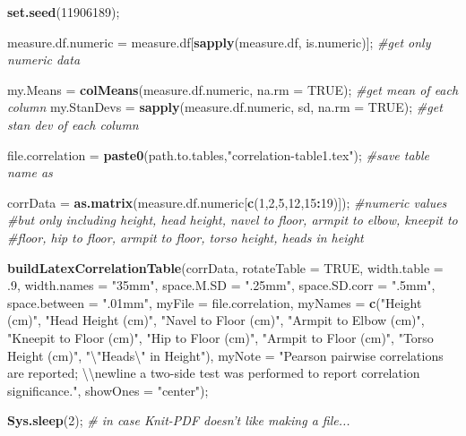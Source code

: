 \documentclass[]{article}
\newenvironment{Shaded}{\begin{snugshade}}{\end{snugshade}}
\newcommand{\CharTok}[1]{\textcolor[rgb]{0.31,0.60,0.02}{#1}}
\newcommand{\CommentTok}[1]{\textcolor[rgb]{0.56,0.35,0.01}{\textit{#1}}}
\newcommand{\DataTypeTok}[1]{\textcolor[rgb]{0.13,0.29,0.53}{#1}}
\newcommand{\DecValTok}[1]{\textcolor[rgb]{0.00,0.00,0.81}{#1}}
\newcommand{\FloatTok}[1]{\textcolor[rgb]{0.00,0.00,0.81}{#1}}
\newcommand{\KeywordTok}[1]{\textcolor[rgb]{0.13,0.29,0.53}{\textbf{#1}}}
\newcommand{\NormalTok}[1]{#1}
\newcommand{\OperatorTok}[1]{\textcolor[rgb]{0.81,0.36,0.00}{\textbf{#1}}}
\newcommand{\OtherTok}[1]{\textcolor[rgb]{0.56,0.35,0.01}{#1}}
\newcommand{\StringTok}[1]{\textcolor[rgb]{0.31,0.60,0.02}{#1}}
\begin{document}
\begin{Shaded}
\begin{Highlighting}[]
\KeywordTok{set.seed}\NormalTok{(}\DecValTok{11906189}\NormalTok{);}

\NormalTok{measure.df.numeric =}\StringTok{ }\NormalTok{measure.df[}\KeywordTok{sapply}\NormalTok{(measure.df, is.numeric)]; }\CommentTok{#get only numeric data}

\NormalTok{my.Means =}\StringTok{ }\KeywordTok{colMeans}\NormalTok{(measure.df.numeric, }\DataTypeTok{na.rm =} \OtherTok{TRUE}\NormalTok{); }\CommentTok{#get mean of each column}
\NormalTok{my.StanDevs =}\StringTok{ }\KeywordTok{sapply}\NormalTok{(measure.df.numeric, sd, }\DataTypeTok{na.rm =} \OtherTok{TRUE}\NormalTok{); }\CommentTok{#get stan dev of each column}

\NormalTok{file.correlation =}\StringTok{ }\KeywordTok{paste0}\NormalTok{(path.to.tables,}\StringTok{"correlation-table1.tex"}\NormalTok{); }\CommentTok{#save table name as}

\NormalTok{corrData =}\StringTok{ }\KeywordTok{as.matrix}\NormalTok{(measure.df.numeric[}\KeywordTok{c}\NormalTok{(}\DecValTok{1}\NormalTok{,}\DecValTok{2}\NormalTok{,}\DecValTok{5}\NormalTok{,}\DecValTok{12}\NormalTok{,}\DecValTok{15}\OperatorTok{:}\DecValTok{19}\NormalTok{)]);  }\CommentTok{#numeric values }
\CommentTok{#but only including height, head height, navel to floor, armpit to elbow, kneepit to }
\CommentTok{#floor, hip to floor, armpit to floor, torso height, heads in height}

\KeywordTok{buildLatexCorrelationTable}\NormalTok{(corrData, }
  \DataTypeTok{rotateTable =} \OtherTok{TRUE}\NormalTok{,}
  \DataTypeTok{width.table =} \FloatTok{.9}\NormalTok{,}
  \DataTypeTok{width.names =} \StringTok{"35mm"}\NormalTok{,}
  \DataTypeTok{space.M.SD =} \StringTok{".25mm"}\NormalTok{,}
  \DataTypeTok{space.SD.corr =} \StringTok{".5mm"}\NormalTok{,}
  \DataTypeTok{space.between =} \StringTok{".01mm"}\NormalTok{,}
  \DataTypeTok{myFile =}\NormalTok{ file.correlation,}
  \DataTypeTok{myNames =} \KeywordTok{c}\NormalTok{(}\StringTok{"Height (cm)"}\NormalTok{, }\StringTok{"Head Height (cm)"}\NormalTok{, }\StringTok{"Navel to Floor (cm)"}\NormalTok{,}
              \StringTok{"Armpit to Elbow (cm)"}\NormalTok{, }\StringTok{"Kneepit to Floor (cm)"}\NormalTok{, }\StringTok{"Hip to Floor (cm)"}\NormalTok{, }
              \StringTok{"Armpit to Floor (cm)"}\NormalTok{, }\StringTok{"Torso Height (cm)"}\NormalTok{, }\StringTok{"}\CharTok{\textbackslash{}"}\StringTok{Heads}\CharTok{\textbackslash{}"}\StringTok{ in Height"}\NormalTok{),}
  \DataTypeTok{myNote =} \StringTok{"Pearson pairwise correlations are reported; }\CharTok{\textbackslash{}\textbackslash{}}\StringTok{newline a two-side test was }
\StringTok{  performed to report correlation significance."}\NormalTok{,}
  \DataTypeTok{showOnes =} \StringTok{"center"}\NormalTok{);}

\KeywordTok{Sys.sleep}\NormalTok{(}\DecValTok{2}\NormalTok{); }\CommentTok{# in case Knit-PDF doesn't like making a file...}
\end{Highlighting}
\end{Shaded}
\end{document}
